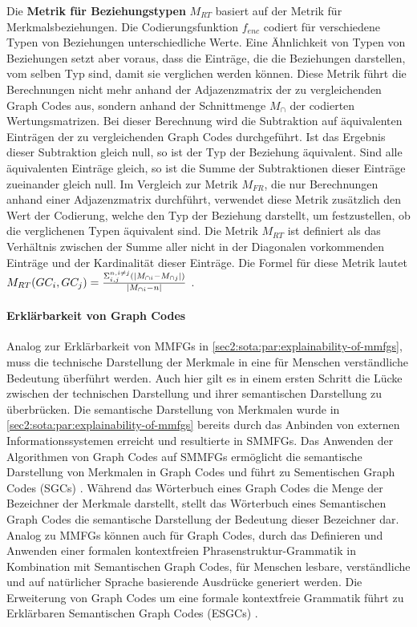 Die \textbf{Metrik für Beziehungstypen} $M_{RT}$ basiert auf der Metrik für Merkmalsbeziehungen.
Die Codierungsfunktion $f_{enc}$ codiert für verschiedene Typen von Beziehungen unterschiedliche Werte.
Eine Ähnlichkeit von Typen von Beziehungen setzt aber voraus, dass die Einträge, die die Beziehungen darstellen, vom selben Typ sind, damit sie verglichen werden können.
Diese Metrik führt die Berechnungen nicht mehr anhand der Adjazenzmatrix der zu vergleichenden Graph Codes aus, sondern anhand der Schnittmenge $M_{\cap}$ der codierten Wertungsmatrizen.
Bei dieser Berechnung wird die Subtraktion auf äquivalenten Einträgen der zu vergleichenden Graph Codes durchgeführt.
Ist das Ergebnis dieser Subtraktion gleich null, so ist der Typ der Beziehung äquivalent.
Sind alle äquivalenten Einträge gleich, so ist die Summe der Subtraktionen dieser Einträge zueinander gleich null.
Im Vergleich zur Metrik $M_{FR}$, die nur Berechnungen anhand einer Adjazenzmatrix durchführt, verwendet diese Metrik zusätzlich den Wert der Codierung, welche den Typ der Beziehung darstellt, um festzustellen, ob die verglichenen Typen äquivalent sind.
Die Metrik $M_{RT}$ ist definiert als das Verhältnis zwischen der Summe aller nicht in der Diagonalen vorkommenden Einträge und der Kardinalität dieser Einträge.
Die Formel für diese Metrik lautet $M_{RT}(GC_i,GC_j) = \frac{\Sigma^{n,i \neq j}_{i,j}(\abs{M_{\cap i} - M_{\cap j}})}{\abs{M_{\cap i} - n}}$ \cite{gc-2d-proj-mmfg}.

\paragraph{Erklärbarkeit von Graph Codes}
Analog zur Erklärbarkeit von MMFGs in \cref{sec2:sota:par:explainability-of-mmfgs}, muss die technische Darstellung der Merkmale in eine für Menschen verständliche Bedeutung überführt werden.
Auch hier gilt es in einem ersten Schritt die Lücke zwischen der technischen Darstellung und ihrer semantischen Darstellung zu überbrücken.
Die semantische Darstellung von Merkmalen wurde in \cref{sec2:sota:par:explainability-of-mmfgs} bereits durch das Anbinden von externen Informationssystemen erreicht und resultierte in SMMFGs.
Das Anwenden der Algorithmen von Graph Codes auf SMMFGs ermöglicht die semantische Darstellung von Merkmalen in Graph Codes und führt zu Sementischen Graph Codes (SGCs) \cite{towards_auto_sem_expl_mmfg}.
Während das Wörterbuch eines Graph Codes die Menge der Bezeichner der Merkmale darstellt, stellt das Wörterbuch eines Semantischen Graph Codes die semantische Darstellung der Bedeutung dieser Bezeichner dar.
Analog zu MMFGs können auch für Graph Codes, durch das Definieren und Anwenden einer formalen kontextfreien Phrasenstruktur-Grammatik in Kombination mit Semantischen Graph Codes, für Menschen lesbare, verständliche und auf natürlicher Sprache basierende Ausdrücke generiert werden.
Die Erweiterung von Graph Codes um eine formale kontextfreie Grammatik führt zu Erklärbaren Semantischen Graph Codes (ESGCs) \cite{exp-mmfg}.

